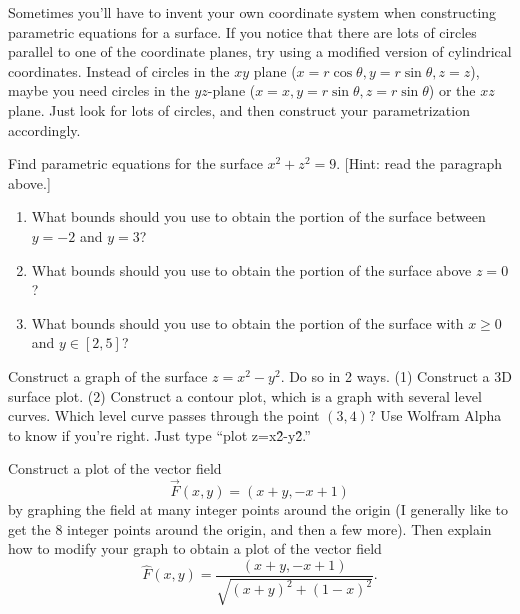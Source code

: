 Sometimes you'll have to invent your own coordinate system when constructing parametric equations for a surface.  If you notice that there are lots of circles parallel to one of the coordinate planes, try using a modified version of cylindrical coordinates. Instead of circles in the $xy$ plane ($x=r\cos\theta,y=r\sin\theta,z=z$), maybe you need circles in the $yz$-plane ($x=x,y=r\sin\theta,z=r\sin\theta$) or the $xz$ plane.  Just look for lots of circles, and then construct your parametrization accordingly.
\begin{problem}
%
Find parametric equations for the surface $x^2+z^2=9$. [Hint: read the paragraph above.]  
\begin{enumerate}
 \item{}%
 What bounds should you use to obtain the portion of the surface between $y=-2$ and $y=3$?
 \item What bounds should you use to obtain the portion of the surface above $z=0$?
 \item What bounds should you use to obtain the portion of the surface with $x\geq 0$ and $y\in[2,5]$?
\end{enumerate}
\end{problem}

\begin{problem}
 Construct a graph of the surface $z = x^2-y^2$.  Do so in 2 ways.  (1) Construct a 3D surface plot.  (2) Construct a contour plot, which is a graph with several level curves. Which level curve passes through the point $(3,4)$? 
 Use Wolfram Alpha to know if you're right.  Just type ``plot z=x\^2-y\^2.''
\end{problem}

\begin{problem}
Construct a plot of the vector field $$\vec F(x,y) = (x+y, -x+1)$$ by graphing the field at many integer points around the origin (I generally like to get the 8 integer points around the origin, and then a few more).
Then explain how to modify your graph to obtain a plot of the vector field $$\hat F(x,y) = \frac{(x+y, -x+1)}{\sqrt{(x+y)^2+(1-x)^2}}.$$ 
\end{problem}

\clearpage

